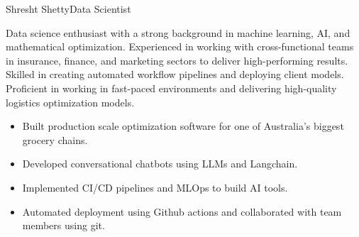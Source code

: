 \documentclass{article}
\begin{document}
\begin{cv}{Shresht Shetty}{Data Scientist}






Data science enthusiast with a strong background in machine learning, AI, and mathematical optimization. Experienced in working with cross-functional teams in insurance, finance, and marketing sectors to deliver high-performing results. Skilled in creating automated workflow pipelines and deploying client models. Proficient in working in fast-paced environments and delivering high-quality logistics optimization models.






\begin{cvevent}[August 2021][present]



    \begin{itemize}

        \item Built production scale optimization software for one of Australia's biggest grocery chains.

        \item Developed conversational chatbots using LLMs and Langchain.

        \item Implemented CI/CD pipelines and MLOps to build AI tools.

        \item Automated deployment using Github actions and collaborated with team members using git.

    \end{itemize}

\end{cvevent}



\cvseparator[2]

\begin{cvevent}[Jan 2020][August 2021]



    \begin{itemize}


\end{itemize}
\end{cvevent}
\end{cv}
\end{document}
